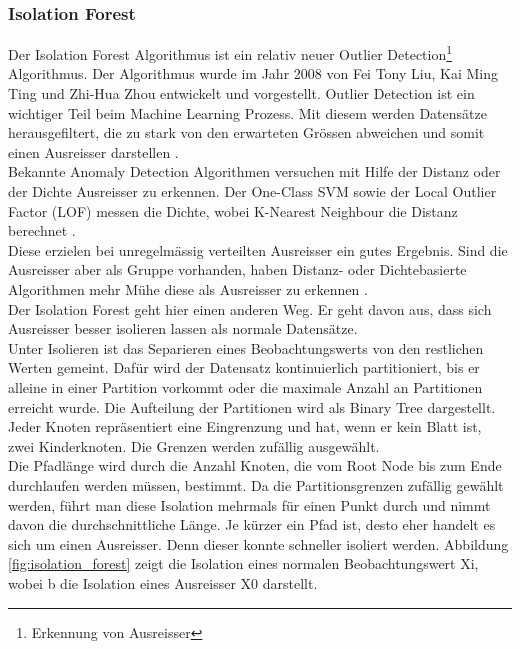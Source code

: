\subsubsection{Isolation Forest}
Der Isolation Forest Algorithmus ist ein relativ neuer Outlier Detection\footnote{Erkennung von Ausreisser} Algorithmus. Der Algorithmus wurde im Jahr 2008 von Fei Tony Liu, Kai Ming Ting und Zhi-Hua Zhou entwickelt und vorgestellt. Outlier Detection ist ein wichtiger Teil beim Machine Learning Prozess. Mit diesem werden Datensätze herausgefiltert, die zu stark von den erwarteten Grössen abweichen und somit einen Ausreisser darstellen \cite{isolation_forest_1}.\\
Bekannte Anomaly Detection Algorithmen versuchen mit Hilfe der Distanz oder der Dichte Ausreisser zu erkennen. Der One-Class SVM sowie der Local Outlier Factor (LOF) messen die Dichte, wobei K-Nearest Neighbour die Distanz berechnet \cite{isolation_forest_2}.\\
Diese erzielen bei unregelmässig verteilten Ausreisser ein gutes Ergebnis. Sind die Ausreisser aber als Gruppe vorhanden, haben Distanz- oder Dichtebasierte Algorithmen mehr Mühe diese als Ausreisser zu erkennen \cite{isolation_forest_3}.\\[2ex]
%
Der Isolation Forest geht hier einen anderen Weg. Er geht davon aus, dass sich Ausreisser besser isolieren lassen als normale Datensätze.\\
Unter Isolieren ist das Separieren eines Beobachtungswerts von den restlichen Werten gemeint. Dafür wird der Datensatz kontinuierlich partitioniert, bis er alleine in einer Partition vorkommt oder die maximale Anzahl an Partitionen erreicht wurde. Die Aufteilung der Partitionen wird als Binary Tree dargestellt. Jeder Knoten repräsentiert eine Eingrenzung und hat, wenn er kein Blatt ist, zwei Kinderknoten. Die Grenzen werden zufällig ausgewählt.\\
Die Pfadlänge wird durch die Anzahl Knoten, die vom Root Node bis zum Ende durchlaufen werden müssen, bestimmt. Da die Partitionsgrenzen zufällig gewählt werden, führt man diese Isolation mehrmals für einen Punkt durch und nimmt davon die durchschnittliche Länge. Je kürzer ein Pfad ist, desto eher handelt es sich um einen Ausreisser. Denn dieser konnte schneller isoliert werden. Abbildung \ref{fig:isolation_forest} zeigt die Isolation  eines normalen Beobachtungswert Xi, wobei b die Isolation eines Ausreisser X0 darstellt.\\
